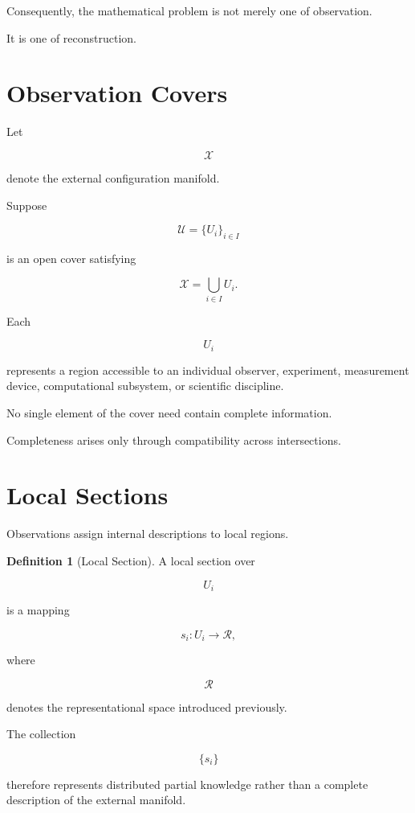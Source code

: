 \documentclass[11pt,oneside]{book}
\numberwithin{equation}{chapter}
\theoremstyle{definition}
\newtheorem{definition}{Definition}[chapter]
\theoremstyle{plain}
\begin{document}
Consequently, the mathematical problem is not merely one of observation.

It is one of reconstruction.

\section{Observation Covers}

Let

\[
\mathcal{X}
\]

denote the external configuration manifold.

Suppose

\[
\mathcal{U}
=
\{
U_i
\}_{i\in I}
\]

is an open cover satisfying

\[
\mathcal{X}
=
\bigcup_{i\in I}
U_i.
\]

Each

\[
U_i
\]

represents a region accessible to an individual observer, experiment,
measurement device, computational subsystem, or scientific discipline.

No single element of the cover need contain complete information.

Completeness arises only through compatibility across intersections.

\section{Local Sections}

Observations assign internal descriptions to local regions.

\begin{definition}[Local Section]

A local section over

\[
U_i
\]

is a mapping

\[
s_i
:
U_i
\rightarrow
\mathcal{R},
\]

where

\[
\mathcal{R}
\]

denotes the representational space introduced previously.

\end{definition}

The collection

\[
\{
s_i
\}
\]

therefore represents distributed partial knowledge rather than a complete
description of the external manifold.
\end{document}
